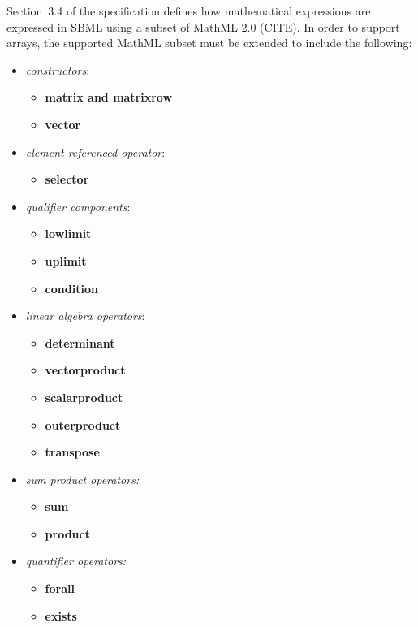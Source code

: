 Section~3.4 of the \sbmlthreecore specification defines how mathematical expressions are expressed in SBML using a subset of MathML 2.0 (CITE).  In order to support arrays, the supported MathML subset must be extended to include the following:
\begin{itemize}
\item \emph{constructors}:
  \begin{itemize}
    \item {\bf matrix and matrixrow} 
    \item {\bf vector}
  \end{itemize}
\item \emph{element referenced operator}:
  \begin{itemize}
  \item {\bf selector}
  \end{itemize}
\item \emph{qualifier components}: 
  \begin{itemize}  
  \item {\bf lowlimit}
  \item {\bf uplimit}
  \item {\bf condition}
  \end{itemize}
\item \emph{linear algebra operators}:
\begin{itemize}
  \item{\bf determinant}
  \item {\bf vectorproduct}
  \item {\bf scalarproduct}
  \item {\bf outerproduct}
  \item {\bf transpose}
\end{itemize}
\item \emph{sum product operators:}
  \begin{itemize}
  \item {\bf sum}
  \item {\bf product}
  \end{itemize}
\item \emph{quantifier operators:}
\begin{itemize}
\item{\bf forall}
\item{\bf exists}
\end{itemize}
\end{itemize}

